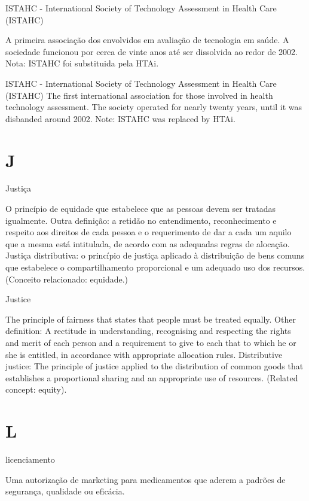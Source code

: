 \documentclass[
]{book}
\begin{document}
ISTAHC - International Society of Technology Assessment in Health Care (ISTAHC)

A primeira associação dos envolvidos em avaliação de tecnologia em saúde. A sociedade funcionou por cerca de vinte anos até ser dissolvida ao redor de 2002. Nota: ISTAHC foi substituida pela HTAi.

ISTAHC - International Society of Technology Assessment in Health Care (ISTAHC)
The first international association for those involved in health technology assessment. The society operated for nearly twenty years, until it was disbanded around 2002. Note: ISTAHC was replaced by HTAi.

\hypertarget{j}{%
\chapter*{J}\label{j}}

Justiça

O princípio de equidade que estabelece que as pessoas devem ser tratadas igualmente. Outra definição: a retidão no entendimento, reconhecimento e respeito aos direitos de cada pessoa e o requerimento de dar a cada um aquilo que a mesma está intitulada, de acordo com as adequadas regras de alocação. Justiça distributiva: o princípio de justiça aplicado à distribuição de bens comuns que estabelece o compartilhamento proporcional e um adequado uso dos recursos. (Conceito relacionado: equidade.)

Justice

The principle of fairness that states that people must be treated equally. Other definition: A rectitude in understanding, recognising and respecting the rights and merit of each person and a requirement to give to each that to which he or she is entitled, in accordance with appropriate allocation rules. Distributive justice: The principle of justice applied to the distribution of common goods that establishes a proportional sharing and an appropriate use of resources. (Related concept: equity).

\hypertarget{l}{%
\chapter*{L}\label{l}}

licenciamento

Uma autorização de marketing para medicamentos que aderem a padrões de segurança, qualidade ou eficácia.
\end{document}
